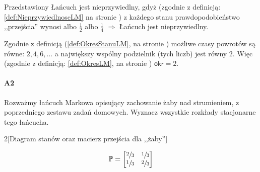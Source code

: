 Przedstawiony Łańcuch jest nieprzywiedlny, gdyż (zgodnie z definicją: \ref{def:NieprzywiedlnoscLM} na stronie \pageref{def:NieprzywiedlnoscLM}) z każdego stanu prawdopodobieństwo ,,przejścia'' wynosi albo $\frac{1}{2}$ albo $\frac{1}{4}$ $\Rightarrow$ Łańcuch jest nieprzywiedlny.

Zgodnie z definicją (\ref{def:OkresStanuLM}, na stronie \pageref{def:OkresStanuLM}) możliwe czasy powrotów są równe: $2, 4, 6, ...$ a największy wspólny podzielnik (tych liczb) jest równy $2$. Więc (zgodnie z definicją: \ref{def:OkresLM}, na stronie \pageref{def:OkresLM}) $\mathsf{okr}=2$.

\paragraph{A2} Rozważmy łańcuch Markowa opisujący zachowanie żaby nad strumieniem, z poprzedniego zestawu zadań domowych. Wyznacz wszystkie rozkłady stacjonarne tego łańcucha.

\begin{multicols}{2}[Diagram stanów oraz macierz przejścia dla ,,żaby'']
\begin{figure}[H]
\centering
{}
\end{figure}

$$\mathbb{P}=\begin{bmatrix}
\sfrac{2}{3}&\sfrac{1}{3}\\
\sfrac{1}{3}&\sfrac{2}{3}
\end{bmatrix}$$
\end{multicols}

